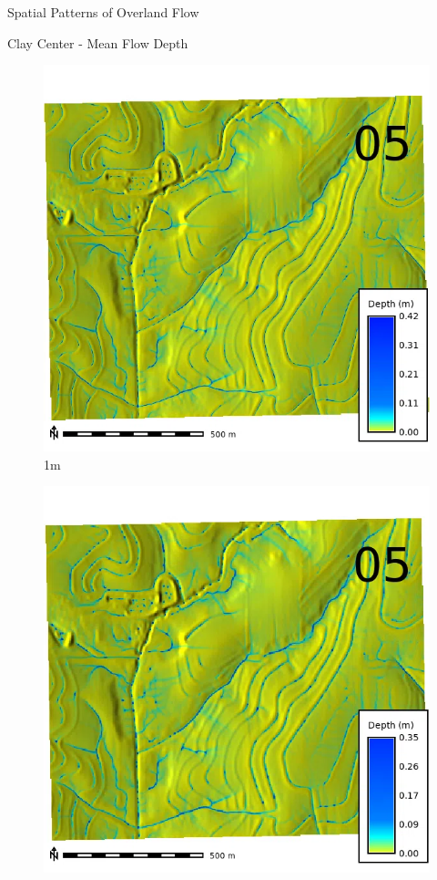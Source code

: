 \documentclass[
  ignorenonframetext,
]{beamer}
\begin{document}
\begin{frame}{Spatial Patterns of Overland Flow}
\begin{block}{Clay Center - Mean Flow Depth}
\begin{figure}[H]
{\centering \includegraphics{../output/clay-center/sensitivity_1/clay-center_depth_1_1_s_average.webp}

}

\caption{1m}

\end{figure}%

\begin{figure}[H]

{\centering \includegraphics{../output/clay-center/sensitivity_1/clay-center_depth_3_1_s_average.webp}

}
\end{figure}
\end{block}
\end{frame}
\end{document}
